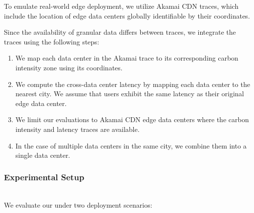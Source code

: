 

To emulate real-world edge deployment, we utilize Akamai CDN traces, which include the location of edge data centers globally identifiable by their coordinates. 


Since the availability of granular data differs between traces, we integrate the traces using the following steps:
\begin{enumerate}[leftmargin=*]
    \item We map each data center in the Akamai trace to its corresponding carbon intensity zone using its coordinates.
    \item We compute the cross-data center latency by mapping each data center to the nearest city. We assume that users exhibit the same latency as their original edge data center.
    \item We limit our evaluations to Akamai CDN edge data centers where the carbon intensity and latency traces are available. 
    \item In the case of multiple data centers in the same city, we combine them into a single data center.
\end{enumerate}

\subsubsection{Experimental Setup} \hfill\\
We evaluate our \proposedsystem under two deployment scenarios:

